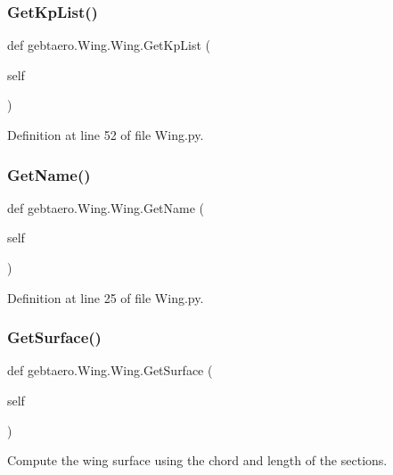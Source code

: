 \subsubsection{\texorpdfstring{Get\+Kp\+List()}{GetKpList()}}
{\footnotesize\ttfamily def gebtaero.\+Wing.\+Wing.\+Get\+Kp\+List (\begin{DoxyParamCaption}\item[{}]{self }\end{DoxyParamCaption})}



Definition at line 52 of file Wing.\+py.

\mbox{\label{classgebtaero_1_1_wing_1_1_wing_a180f53c7c326569cc0c8e8c78a3a0b2a}} 
\subsubsection{\texorpdfstring{Get\+Name()}{GetName()}}
{\footnotesize\ttfamily def gebtaero.\+Wing.\+Wing.\+Get\+Name (\begin{DoxyParamCaption}\item[{}]{self }\end{DoxyParamCaption})}



Definition at line 25 of file Wing.\+py.

\mbox{\label{classgebtaero_1_1_wing_1_1_wing_af0be9af67eb300ebc83262025f6c80af}} 
\subsubsection{\texorpdfstring{Get\+Surface()}{GetSurface()}}
{\footnotesize\ttfamily def gebtaero.\+Wing.\+Wing.\+Get\+Surface (\begin{DoxyParamCaption}\item[{}]{self }\end{DoxyParamCaption})}



Compute the wing surface using the chord and length of the sections. 

